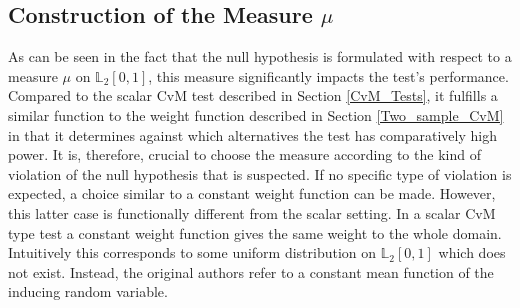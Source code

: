 \documentclass[12pt, a4paper]{article}
\theoremstyle{MAstyle} \newtheorem{assumption}{Assumption}[section]
\theoremstyle{MAstyle} \newtheorem{definition}{Definition}[section]
\theoremstyle{MAstyle} \newtheorem{theorem}{Theorem}[section]
\begin{document}
		\subsection{Construction of the Measure $\mu$}\label{mu}
			As can be seen in the fact that the null hypothesis is formulated with respect to a measure $\mu$ on $\mathbb{L}_2[0,1]$, this measure significantly impacts the test's performance. Compared to the scalar CvM test described in Section \ref{CvM_Tests}, it fulfills a similar function to the weight function described in Section \ref{Two_sample_CvM} in that it determines against which alternatives the test has comparatively high power. It is, therefore, crucial to choose the measure according to the kind of violation of the null hypothesis that is suspected. If no specific type of violation is expected, a choice similar to a constant weight function can be made. However, this latter case is functionally different from the scalar setting. In a scalar  CvM type test a constant weight function gives the same weight to the whole domain. Intuitively this corresponds to some uniform distribution on $\mathbb{L}_2[0,1]$ which does not exist. Instead, the original authors refer to a constant mean function of the inducing random variable.
			
\end{document}
